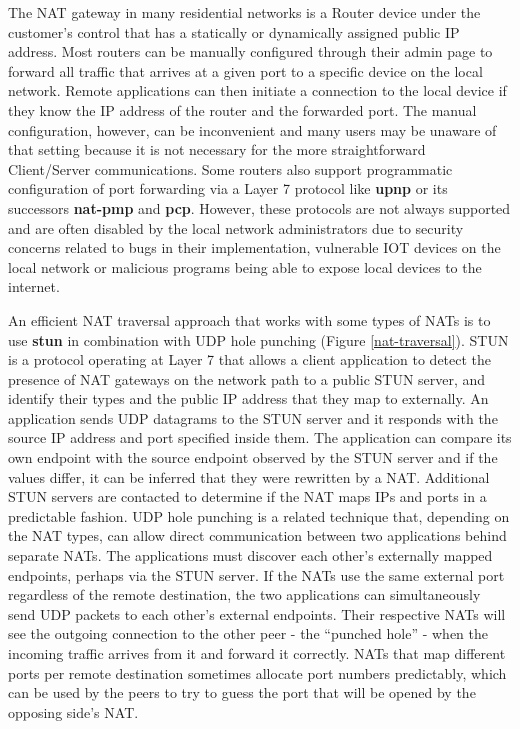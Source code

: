 The NAT gateway in many residential networks is a Router device under
the customer's control that has a statically or dynamically assigned
public IP address. Most routers can be manually configured through their
admin page to forward all traffic that arrives at a given port to a
specific device on the local network. Remote applications can then
initiate a connection to the local device if they know the IP address of
the router and the forwarded port. The manual configuration, however,
can be inconvenient and many users may be unaware of that setting
because it is not necessary for the more straightforward Client/Server
communications. Some routers also support programmatic configuration of
port forwarding via a Layer 7 protocol like \textbf{\gls{upnp}} or its
successors \textbf{\gls{nat-pmp}} and \textbf{\gls{pcp}}. However, these
protocols are not always supported and are often disabled by the local
network administrators due to security concerns related to bugs in their
implementation, vulnerable IOT devices on the local network or malicious
programs being able to expose local devices to the internet.

An efficient NAT traversal approach that works with some types of NATs
is to use \textbf{\gls{stun}} \autocite{stunRFC} in combination with UDP
hole punching (Figure \ref{nat-traversal}). STUN is a protocol operating
at Layer 7 that allows a client application to detect the presence of
NAT gateways on the network path to a public STUN server, and identify
their types and the public IP address that they map to externally. An
application sends UDP datagrams to the STUN server and it responds with
the source IP address and port specified inside them. The application
can compare its own endpoint with the source endpoint observed by the
STUN server and if the values differ, it can be inferred that they were
rewritten by a NAT. Additional STUN servers are contacted to determine
if the NAT maps IPs and ports in a predictable fashion. UDP hole
punching is a related technique that, depending on the NAT types, can
allow direct communication between two applications behind separate
NATs. The applications must discover each other's externally mapped
endpoints, perhaps via the STUN server. If the NATs use the same
external port regardless of the remote destination, the two applications
can simultaneously send UDP packets to each other's external endpoints.
Their respective NATs will see the outgoing connection to the other peer
- the ``punched hole'' - when the incoming traffic arrives from it and
forward it correctly. NATs that map different ports per remote
destination sometimes allocate port numbers predictably, which can be
used by the peers to try to guess the port that will be opened by the
opposing side's NAT.

